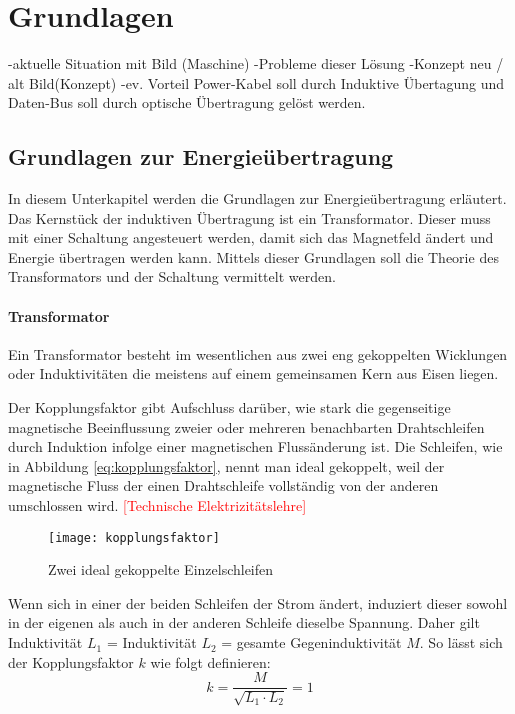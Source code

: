 \section{Grundlagen}\label{sec:Grundlagen}

-aktuelle Situation mit Bild (Maschine)
-Probleme dieser Lösung
-Konzept neu / alt Bild(Konzept)
-ev. Vorteil
Power-Kabel soll durch Induktive Übertagung und Daten-Bus soll durch optische Übertragung gelöst werden.


\subsection{Grundlagen zur Energieübertragung}
In diesem Unterkapitel werden die Grundlagen zur Energieübertragung erläutert. Das Kernstück der induktiven Übertragung ist ein Transformator. Dieser muss mit einer Schaltung angesteuert werden, damit sich das Magnetfeld ändert und Energie übertragen werden kann. Mittels dieser Grundlagen soll die Theorie des Transformators und der Schaltung vermittelt werden.

\paragraph{Transformator}
Ein Transformator besteht im wesentlichen aus zwei eng gekoppelten Wicklungen oder Induktivitäten die meistens auf einem gemeinsamen Kern aus Eisen liegen. 

Der Kopplungsfaktor gibt Aufschluss darüber, wie stark die gegenseitige magnetische Beeinflussung zweier oder mehreren benachbarten Drahtschleifen durch Induktion infolge einer magnetischen Flussänderung ist. Die Schleifen, wie in Abbildung \ref{eq:kopplungsfaktor}, nennt man ideal gekoppelt, weil der magnetische Fluss der einen Drahtschleife vollständig von der anderen umschlossen wird. \textcolor{red}{[Technische Elektrizitätslehre]}

\begin{figure}[H]
	\centering
	\texttt{[image: kopplungsfaktor]}
	\caption{Zwei ideal gekoppelte Einzelschleifen}\label{fig:kopplungsfaktor}
\end{figure}
Wenn sich in einer der beiden Schleifen der Strom ändert, induziert dieser sowohl in der eigenen als auch in der anderen Schleife dieselbe Spannung. Daher gilt Induktivität $ L_{1}$ = Induktivität $L_{2}$ = gesamte Gegeninduktivität $M$.
So lässt sich der Kopplungsfaktor $ k $ wie folgt definieren:
\begin{equation}
k=\frac{M}{\sqrt{L_{1}\cdot L_{2}}} = 1
\label{eq:kopplungsfaktor}
\end{equation}

